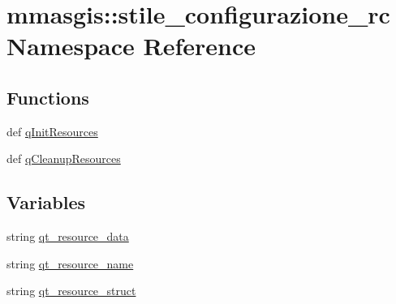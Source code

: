 \hypertarget{namespacemmasgis_1_1stile__configurazione__rc}{
\section{mmasgis::stile\_\-configurazione\_\-rc Namespace Reference}
\label{namespacemmasgis_1_1stile__configurazione__rc}
}
\subsection*{Functions}
\begin{DoxyCompactItemize}
\item 
def \hyperlink{namespacemmasgis_1_1stile__configurazione__rc_a30f47d250a93aaf49665c49fbdff70d6}{qInitResources}
\item 
def \hyperlink{namespacemmasgis_1_1stile__configurazione__rc_a9ebacd81f93a0c11e12f2dcc75fed865}{qCleanupResources}
\end{DoxyCompactItemize}
\subsection*{Variables}
\begin{DoxyCompactItemize}
\item 
string \hyperlink{namespacemmasgis_1_1stile__configurazione__rc_a0c698360c599ea85940516e0038d06e1}{qt\_\-resource\_\-data}
\item 
string \hyperlink{namespacemmasgis_1_1stile__configurazione__rc_a4c662a89368381187d1db8d6a15de9c7}{qt\_\-resource\_\-name}
\item 
string \hyperlink{namespacemmasgis_1_1stile__configurazione__rc_ad1e87df11ed7cb89d08ea3e2a2218144}{qt\_\-resource\_\-struct}
\end{DoxyCompactItemize}


